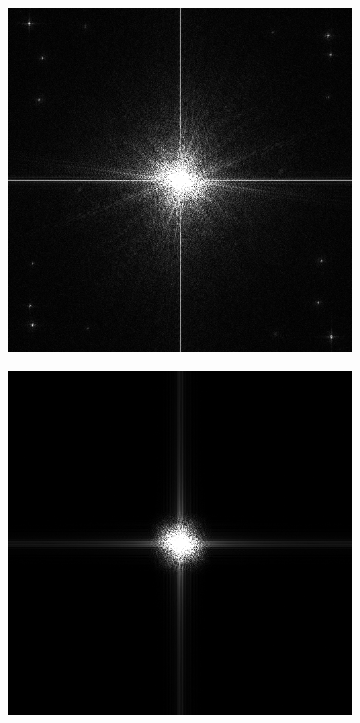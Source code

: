 \begin{figure}[htbp]
\begin{subfigure}[t]{0.2\textwidth}
  \end{subfigure}%
  \hspace*{0.02\textwidth}
  \begin{subfigure}[t]{0.2\textwidth}
    \centering
    \includegraphics[width=\textwidth]{figs/fourier/peppers_fourier.png}
  \end{subfigure}%
  \hspace*{0.02\textwidth}
  \begin{subfigure}[t]{0.2\textwidth}
    \centering
    \includegraphics[width=\textwidth]{figs/fourier/peppers_blur_fourier.png}

\end{subfigure}
\end{figure}
